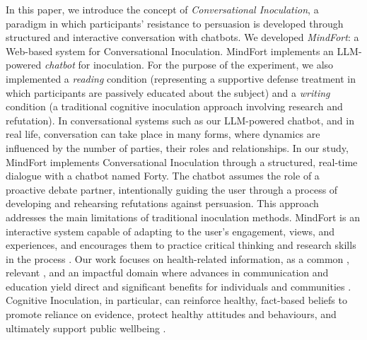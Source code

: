 \documentclass[sigconf]{acmart}
\begin{document}
In this paper, we introduce the concept of \textit{Conversational Inoculation}, a paradigm in which participants' resistance to persuasion is developed through structured and interactive conversation with chatbots. 
We developed \textit{MindFort}: a Web-based system for Conversational Inoculation. 
MindFort implements an LLM-powered \textit{chatbot} for inoculation.
For the purpose of the experiment, we also implemented a \textit{reading} condition (representing a supportive defense treatment in which participants are passively educated about the subject) and a \textit{writing} condition (a traditional cognitive inoculation approach involving research and refutation).
In conversational systems such as our LLM-powered chatbot, and in real life, conversation can take place in many forms, where dynamics are influenced by the number of parties, their roles and relationships.
In our study, MindFort implements Conversational Inoculation through a structured, real-time dialogue with a chatbot named Forty. The chatbot assumes the role of a proactive debate partner, intentionally guiding the user through a process of developing and rehearsing refutations against persuasion.
This approach addresses the main limitations of traditional inoculation methods. MindFort is an interactive system capable of adapting to the user's engagement, views, and experiences, and encourages them to practice critical thinking and research skills in the process \cite{Zarzosa_Ruvalcaba_2025}.
Our work focuses on health-related information, as a common \cite{Banas_Rains_2010}, relevant \cite{Passanante_Pertwee_Lin_Lee_Wu_Larson_2023}, and an impactful domain where advances in communication and education yield direct and significant benefits for individuals and communities \cite{Compton_Jackson_Dimmock_2016}.
Cognitive Inoculation, in particular, can reinforce healthy, fact-based beliefs to promote reliance on evidence, protect healthy attitudes and behaviours, and ultimately support public wellbeing  \cite{Compton_Jackson_Dimmock_2016}.
\end{document}
